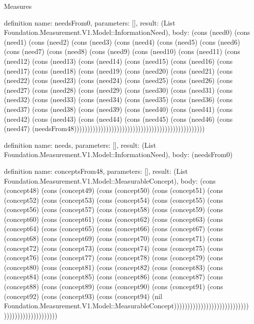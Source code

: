 \begin{lexlean}{Measures}
\begin{semanticmodule}
definition{
  name: needsFrom0,
  parameters: [],
  result: (List Foundation.Measurement.V1.Model::InformationNeed),
  body: (cons (need0) (cons (need1) (cons (need2) (cons (need3) (cons (need4) (cons (need5) (cons (need6) (cons (need7) (cons (need8) (cons (need9) (cons (need10) (cons (need11) (cons (need12) (cons (need13) (cons (need14) (cons (need15) (cons (need16) (cons (need17) (cons (need18) (cons (need19) (cons (need20) (cons (need21) (cons (need22) (cons (need23) (cons (need24) (cons (need25) (cons (need26) (cons (need27) (cons (need28) (cons (need29) (cons (need30) (cons (need31) (cons (need32) (cons (need33) (cons (need34) (cons (need35) (cons (need36) (cons (need37) (cons (need38) (cons (need39) (cons (need40) (cons (need41) (cons (need42) (cons (need43) (cons (need44) (cons (need45) (cons (need46) (cons (need47) (needsFrom48)))))))))))))))))))))))))))))))))))))))))))))))))
}

definition{
  name: needs,
  parameters: [],
  result: (List Foundation.Measurement.V1.Model::InformationNeed),
  body: (needsFrom0)
}

definition{
  name: conceptsFrom48,
  parameters: [],
  result: (List Foundation.Measurement.V1.Model::MeasurableConcept),
  body: (cons (concept48) (cons (concept49) (cons (concept50) (cons (concept51) (cons (concept52) (cons (concept53) (cons (concept54) (cons (concept55) (cons (concept56) (cons (concept57) (cons (concept58) (cons (concept59) (cons (concept60) (cons (concept61) (cons (concept62) (cons (concept63) (cons (concept64) (cons (concept65) (cons (concept66) (cons (concept67) (cons (concept68) (cons (concept69) (cons (concept70) (cons (concept71) (cons (concept72) (cons (concept73) (cons (concept74) (cons (concept75) (cons (concept76) (cons (concept77) (cons (concept78) (cons (concept79) (cons (concept80) (cons (concept81) (cons (concept82) (cons (concept83) (cons (concept84) (cons (concept85) (cons (concept86) (cons (concept87) (cons (concept88) (cons (concept89) (cons (concept90) (cons (concept91) (cons (concept92) (cons (concept93) (cons (concept94) (nil Foundation.Measurement.V1.Model::MeasurableConcept))))))))))))))))))))))))))))))))))))))))))))))))
}


\end{semanticmodule}
\end{lexlean}
